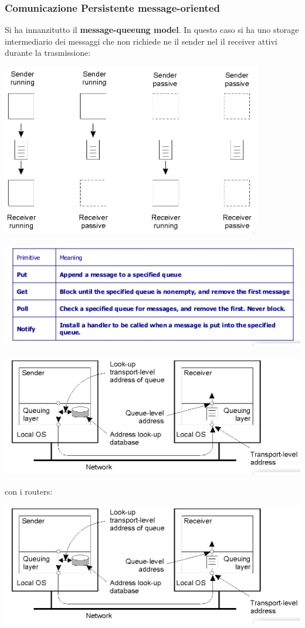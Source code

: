 \message{ !name(sd.tex)}\documentclass[a4paper,12pt, oneside]{book}
\begin{document}
\subsubsection{Comunicazione Persistente message-oriented}
Si ha innanzitutto il \textbf{message-queeung model}. In questo caso si ha uno storage intermediario dei messaggi che non richiede ne il sender nel il receiver attivi durante la trasmissione:
\begin{center}
	\includegraphics[scale=0.8]{img/que.png}
\end{center}
\begin{center}
	\includegraphics[scale=0.8]{img/queu2.png}
\end{center}
\begin{center}
	\includegraphics[scale=0.8]{img/queu3.png}
\end{center}
con i routers:
\begin{center}
	\includegraphics[scale=0.8]{img/queu3.png}
\end{center}
\end{document}

